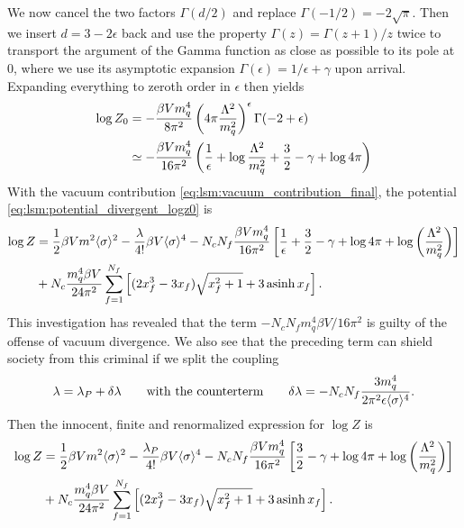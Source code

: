 We now cancel the two factors $\Gamma(d/2)$ and replace $\Gamma(-1/2) = -2\sqrt{\pi}$.
Then we insert $d = 3 - 2 \epsilon$ back and use the property $\Gamma(z) = \Gamma(z+1) / z$ twice to transport the argument of the Gamma function as close as possible to its pole at $0$,
where we use its asymptotic expansion $\Gamma(\epsilon) = 1/\epsilon + \gamma$ upon arrival.
Expanding everything to zeroth order in $\epsilon$ then yields
\begin{equation}
\begin{split}
	\log Z_0 &=       -\frac{\beta V m_q^4}{8 \pi^2} \left( 4 \pi \frac{\Lambda^2}{m_q^2} \right)^\epsilon \Gamma(-2 + \epsilon) \\
	         &\simeq -\frac{\beta V m_q^4}{16 \pi^2} \left( \frac{1}{\epsilon} + \log \frac{\Lambda^2}{m_q^2} + \frac32 - \gamma + \log 4 \pi \right)
\end{split}
\label{eq:lsm:vacuum_contribution_final}
\end{equation}
With the vacuum contribution \eqref{eq:lsm:vacuum_contribution_final}, the potential \eqref{eq:lsm:potential_divergent_logz0} is
\begin{equation}
\begin{split}
	\log Z &= \frac12 \beta V m^2 \langle \sigma \rangle^2 - \frac{\lambda}{4!} \beta V \langle \sigma \rangle^4 - N_c N_f \frac{\beta V m_q^4}{16 \pi^2} \left[ \frac{1}{\epsilon} + \frac{3}{2} - \gamma + \log 4 \pi + \log\left(\frac{{\Lambda}^2}{m_q^2}\right) \right] \\
	       &+ N_c \frac{m_q^4 \beta V}{24 \pi^2} \sum_{f=1}^{N_f} \left[ (2 x_f^3 - 3x_f) \sqrt{x_f^2 + 1} + 3 \operatorname{asinh} x_f \right] .
\end{split}
\end{equation}
This investigation has revealed that the term $-N_c N_f m_q^4 \beta V / 16 \pi^2$ is guilty of the offense of vacuum divergence.
We also see that the preceding term can shield society from this criminal if we split the coupling 
\begin{equation}
	\lambda = \lambda_P + \delta\lambda
	\qquad \text{with the counterterm} \qquad
	\delta\lambda = -N_c N_f \frac{3 m_q^4}{2 \pi^2 \epsilon \langle \sigma \rangle^4} .
\end{equation}
Then the innocent, finite and renormalized expression for $\log Z$ is
\begin{equation}
\begin{split}
	\log Z &= \frac12 \beta V m^2 \langle \sigma \rangle^2 - \frac{\lambda_P}{4!} \beta V \langle \sigma \rangle^4 - N_c N_f \frac{\beta V m_q^4}{16 \pi^2} \left[ \frac{3}{2} - \gamma + \log 4 \pi + \log\left(\frac{{\Lambda}^2}{m_q^2}\right) \right] \\
	       &+ N_c \frac{m_q^4 \beta V}{24 \pi^2} \sum_{f=1}^{N_f} \left[ (2 x_f^3 - 3x_f) \sqrt{x_f^2 + 1} + 3 \operatorname{asinh} x_f \right] .
\end{split}
\end{equation}
